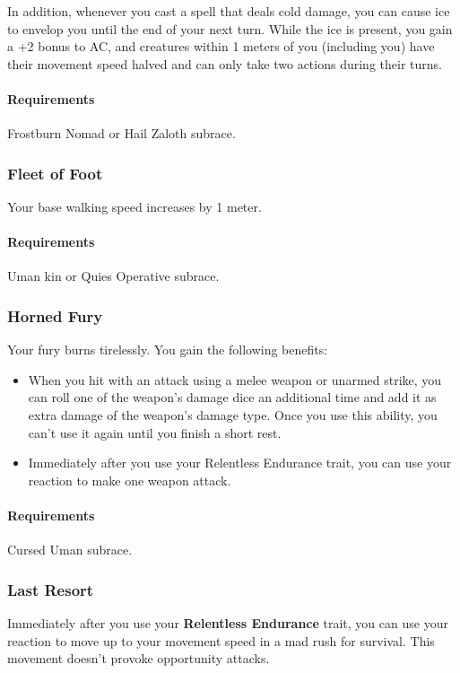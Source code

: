         In addition, whenever you cast a spell that deals cold damage, you can cause ice to envelop you until the end of your next turn.
        While the ice is present, you gain a +2 bonus to AC, and creatures within 1 meters of you (including you) have their movement speed halved and can only take two actions during their turns.
        \paragraph{Requirements} Frostburn Nomad or Hail Zaloth subrace.
    \subsubsection{Fleet of Foot} \label{feat::fleetoffoot}
        Your base walking speed increases by 1 meter.
        \paragraph{Requirements} Uman kin or Quies Operative subrace.
    \subsubsection{Horned Fury} \label{feat::hornedfury}
        Your fury burns tirelessly.
        You gain the following benefits:
        \begin{itemize}
            \item When you hit with an attack using a melee weapon or unarmed strike, you can roll one of the weapon's damage dice an additional time and add it as extra damage of the weapon's damage type.
            Once you use this ability, you can't use it again until you finish a short rest.
            \item Immediately after you use your Relentless Endurance trait, you can use your reaction to make one weapon attack.
        \end{itemize}
        \paragraph{Requirements} Cursed Uman subrace.
    \subsubsection{Last Resort} \label{feat::lastresort}
        Immediately after you use your \textbf{Relentless Endurance} trait, you can use your reaction to move up to your movement speed in a mad rush for survival.
        This movement doesn't provoke opportunity attacks.
